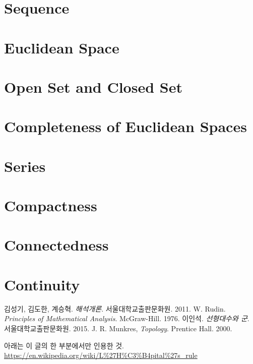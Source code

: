 \documentclass[12pt]{article}
\theoremstyle{definition}
\begin{document}
\section{Sequence}

\section{Euclidean Space}

\section{Open Set and Closed Set}

\section{Completeness of Euclidean Spaces}

\section{Series}

\section{Compactness}

\section{Connectedness}

\section{Continuity}




\begin{thebibliography}{99}
	
	\label{ref1} 김성기, 김도한, 계승혁. \emph{해석개론}. 서울대학교출판문화원. 2011.
	\label{ref2} W. Rudin. \emph{Principles of Mathematical Analysis}. McGraw-Hill. 1976.
	 이인석. \emph{선형대수와 군}. 서울대학교출판문화원. 2015.
	 J. R. Munkres, \emph{Topology}. Prentice Hall. 2000.
	
	
	아래는 이 글의 한 부분에서만 인용한 것.
	 \url{https://en.wikipedia.org/wiki/L%27H%C3%B4pital%27s_rule}
		
\end{thebibliography}
\end{document}
